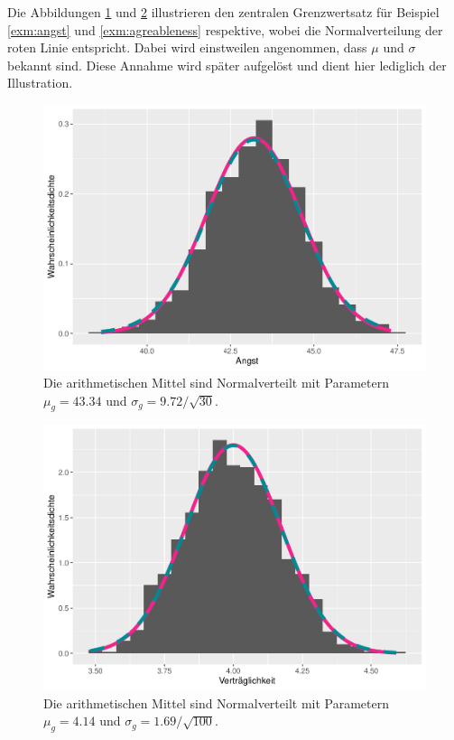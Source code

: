 \documentclass[
]{book}
\theoremstyle{definition}
\theoremstyle{definition}
\theoremstyle{definition}
\theoremstyle{definition}
\theoremstyle{remark}
\begin{document}
Die Abbildungen \ref{fig:exm-angst-normal-approx} und \ref{fig:exm-agreableness-normal-approx} illustrieren den zentralen Grenzwertsatz für Beispiel \ref{exm:angst} und \ref{exm:agreableness} respektive, wobei die Normalverteilung der roten Linie entspricht. Dabei wird einstweilen angenommen, dass \(\mu\) und \(\sigma\) bekannt sind. Diese Annahme wird später aufgelöst und dient hier lediglich der Illustration.

\begin{figure}
\centering
\includegraphics{aps_statistik1_files/figure-latex/exm-angst-normal-approx-1.pdf}
\caption{\label{fig:exm-angst-normal-approx}Die arithmetischen Mittel sind Normalverteilt mit Parametern \(\mu_g = 43.34\) und \(\sigma_g = 9.72 / \sqrt{30}\).}
\end{figure}

\begin{figure}
\centering
\includegraphics{aps_statistik1_files/figure-latex/exm-agreableness-normal-approx-1.pdf}
\caption{\label{fig:exm-agreableness-normal-approx}Die arithmetischen Mittel sind Normalverteilt mit Parametern \(\mu_g = 4.14\) und \(\sigma_g = 1.69 / \sqrt{100}\).}
\end{figure}
\end{document}
